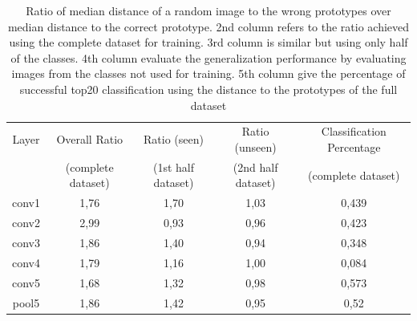 \begin{table}[htb]
\centering
\begin{tabular}{|c|c||c|c||c|}
  \hline
  Layer & Overall Ratio & Ratio (seen)  & Ratio (unseen) & Classification Percentage\\
        & (complete dataset) & (1st half dataset) & (2nd half dataset) &(complete dataset)\\
  \hline
  conv1 & 1,76 & 1,70 & 1,03 & 0,439 \\ 
  conv2 & 2,99 & 0,93 & 0,96 & 0,423 \\ 
  conv3 & 1,86 & 1,40 & 0,94 & 0,348 \\ 
  conv4 & 1,79 & 1,16 & 1,00 & 0,084 \\ 
  conv5 & 1,68 & 1,32 & 0,98 & 0,573 \\ 
  pool5 & 1,86 & 1,42 & 0,95 & 0,52  \\ 
  \hline
\end{tabular}
\caption{Ratio of median distance of a random image to the wrong prototypes over median distance to the correct prototype. 2nd column refers to the ratio achieved using the complete dataset for training. 3rd column is similar but using only half of the classes. 4th column evaluate the generalization performance by evaluating images from the classes not used for training. 5th column give the percentage of successful top20 classification using the distance to the prototypes of the full dataset}
\label{fulltrainvalues}
\end{table}

